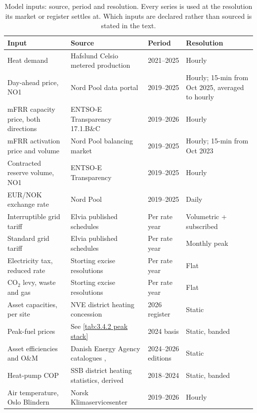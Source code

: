 \begin{table}[h]
\centering
\caption{Model inputs: source, period and resolution. Every series is used at the resolution its market or register settles at. Which inputs are declared rather than sourced is stated in the text.}
\small
\begin{tabular}{p{3.4cm} p{5.4cm} p{2.4cm} p{2.2cm}}
\toprule
\textbf{Input} & \textbf{Source} & \textbf{Period} & \textbf{Resolution} \\
\midrule
Heat demand & Hafslund Celsio metered production & 2021--2025 & Hourly \\
Day-ahead price, NO1 & Nord Pool data portal \cite{nord_pool_nord_nodate} & 2019--2025 & Hourly; 15-min from Oct 2025, averaged to hourly \\
mFRR capacity price, both directions & ENTSO-E Transparency 17.1.B\&C \cite{entsoe_entsoe_nodate} & 2019--2026 & Hourly \\
mFRR activation price and volume & Nord Pool balancing market \cite{nord_pool_nord_nodate} & 2019--2025 & Hourly; 15-min from Oct 2023 \\
Contracted reserve volume, NO1 & ENTSO-E Transparency \cite{entsoe_entsoe_nodate} & 2019--2025 & Hourly \\
EUR/NOK exchange rate & Nord Pool \cite{nord_pool_nord_nodate} & 2019--2025 & Daily \\
Interruptible grid tariff & Elvia published schedules \cite{elvia_dagens_2022} & Per rate year & Volumetric + subscribed \\
Standard grid tariff & Elvia published schedules \cite{elvia_dagens_2022} & Per rate year & Monthly peak \\
Electricity tax, reduced rate & Storting excise resolutions \cite{stortinget_stortingsvedtak_nodate} & Per rate year & Flat \\
CO$_2$ levy, waste and gas & Storting excise resolutions \cite{stortinget_stortingsvedtak_nodate} & Per rate year & Flat \\
Asset capacities, per site & NVE district heating concession \cite{nve_konsesjonssak_2026} & 2026 register & Static \\
Peak-fuel prices & See \autoref{tab:3.4.2 peak stack} & 2024 basis & Static, banded \\
Asset efficiencies and O\&M & Danish Energy Agency catalogues \cite{danish_energy_agency_technology_2024}, \cite{danish_energy_agency_energy_2025} & 2024--2026 editions & Static \\
Heat-pump COP & SSB district heating statistics, derived \cite{statistisk_sentralbyra_statbank_nodate} & 2018--2024 & Static, banded \\
Air temperature, Oslo Blindern & Norsk Klimaservicesenter \cite{norsk_klima_service_senter_observasjoner_nodate} & 2019--2026 & Hourly \\
\bottomrule
\end{tabular}
\label{tab:3.4.2 model input}
\end{table}

